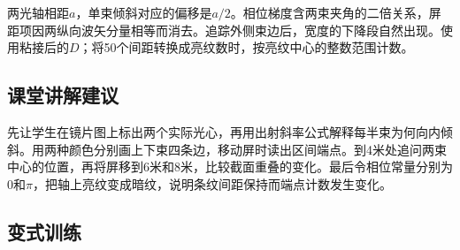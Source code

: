 \documentclass[UTF8,fontset=fandol,a4paper,11pt]{ctexart}
\begin{document}
两光轴相距$a$，单束倾斜对应的偏移是$a/2$。相位梯度含两束夹角的二倍关系，屏距项因两纵向波矢分量相等而消去。追踪外侧束边后，宽度的下降段自然出现。使用粘接后的$D$；将50个间距转换成亮纹数时，按亮纹中心的整数范围计数。



\subsection*{课堂讲解建议}

先让学生在镜片图上标出两个实际光心，再用出射斜率公式解释每半束为何向内倾斜。用两种颜色分别画上下束四条边，移动屏时读出区间端点。到4米处追问两束中心的位置，再将屏移到6米和8米，比较截面重叠的变化。最后令相位常量分别为0和$\pi$，把轴上亮纹变成暗纹，说明条纹间距保持而端点计数发生变化。



\subsection*{变式训练}
\end{document}
